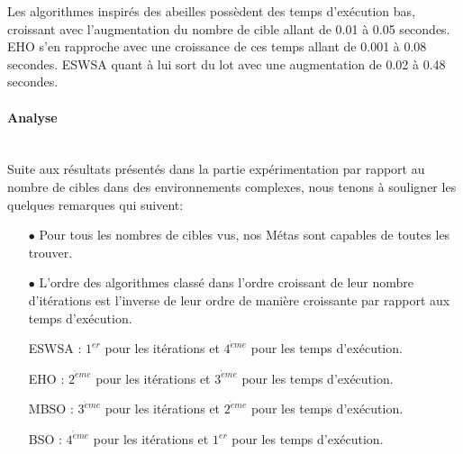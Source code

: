 	Les algorithmes inspirés des abeilles possèdent des temps d'exécution bas, croissant avec l'augmentation du nombre de cible allant de 0.01 à 0.05 secondes. EHO s'en rapproche avec une croissance de ces temps allant de 0.001 à 0.08 secondes. ESWSA quant à lui sort du lot avec une augmentation de 0.02 à 0.48 secondes.
	
\newpage	

\noindent
\begin{minipage}[t]{0.54\textwidth}
	\vspace{-1cm}
	\captionsetup{width=0.8\linewidth}
	\centering{}
	\label{INc}
\end{minipage}\hfill
\hspace{-0.5cm}
\begin{minipage}[t]{0.54\textwidth}
	\vspace{-1cm}
	\captionsetup{width=0.8\linewidth}
	\centering{}
	\label{tNc}
\end{minipage}\hfill





\paragraph{Analyse}
\textbf{ }\\
Suite aux résultats présentés dans la partie expérimentation par rapport au nombre de cibles dans des environnements complexes, nous tenons à souligner les quelques remarques qui suivent:
\begin{itemize}
	\item[$\bullet$] Pour tous les nombres de cibles vus, nos Métas sont capables de toutes les trouver.
	\item[$\bullet$] L'ordre des algorithmes classé dans l'ordre croissant de leur nombre d'itérations est l'inverse de leur ordre de manière croissante par rapport aux temps d'exécution.
	
	ESWSA : $1^{er}$ pour les itérations et $4^{\grave{e}me}$ pour les temps d'exécution.
	
	EHO : $2^{\grave{e}me}$ pour les itérations et $3^{\grave{e}me}$ pour les temps d'exécution.
	
	MBSO : $3^{\grave{e}me}$ pour les itérations et $2^{\grave{e}me}$ pour les temps d'exécution.
	
	BSO : $4^{\grave{e}me}$ pour les itérations et $1^{er}$ pour les temps d'exécution.
\end{itemize}


